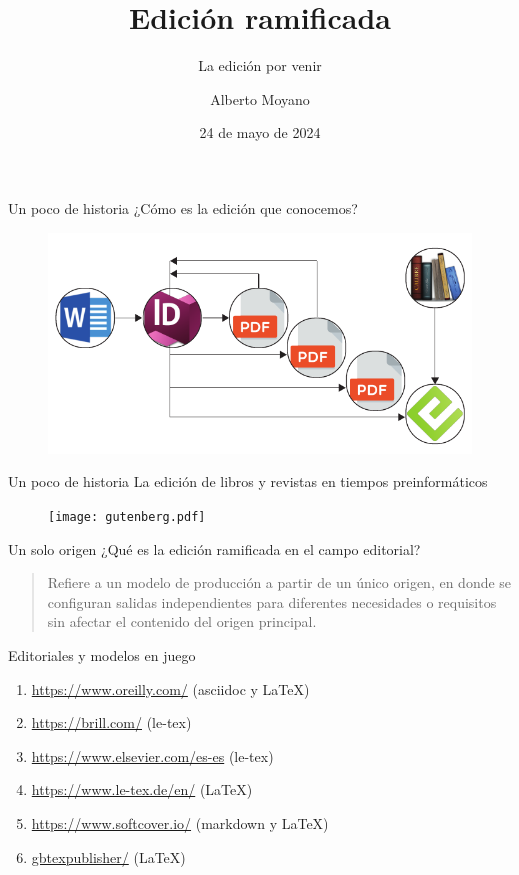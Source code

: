 \documentclass[14pt,aspectratio=169]{beamer}
\title{Edición ramificada}
\subtitle{La edición por venir}
\author{Alberto Moyano}
\date{24 de mayo de 2024}
\institute{\url{https://github.com/albertomoyano/CHARLAUNPaz}}
\begin{document}
	\begin{frame}
		\titlepage
	\end{frame}

\begin{frame}{Un poco de historia}
	¿Cómo es la edición que conocemos?

	\begin{figure}
	\centering
	\includegraphics[width=.7\textwidth]{ciclos.pdf}
\end{figure}
\end{frame}

\begin{frame}{Un poco de historia}
	La edición de libros y revistas en tiempos preinformáticos
	\begin{figure}
		\centering
		\texttt{[image: gutenberg.pdf]}
	\end{figure}
\end{frame}

\begin{frame}{Un solo origen}
	¿Qué es la edición ramificada en el campo editorial?\vspace{14pt}

	\begin{quote}
	Refiere a un modelo de producción a partir de un único origen, en donde se configuran salidas independientes para diferentes necesidades o requisitos sin afectar el contenido del origen principal.
	\end{quote}
\end{frame}

\begin{frame}{Editoriales y modelos en juego}
	\begin{enumerate}
		\item \url{https://www.oreilly.com/} (asciidoc y LaTeX)
		\item \url{https://brill.com/} (le-tex)
		\item \url{https://www.elsevier.com/es-es} (le-tex)
		\item \url{https://www.le-tex.de/en/} (LaTeX)
		\item \url{https://www.softcover.io/} (markdown y LaTeX)
		\item \url{gbtexpublisher/} (LaTeX)
	\end{enumerate}
\end{frame}
\end{document}

